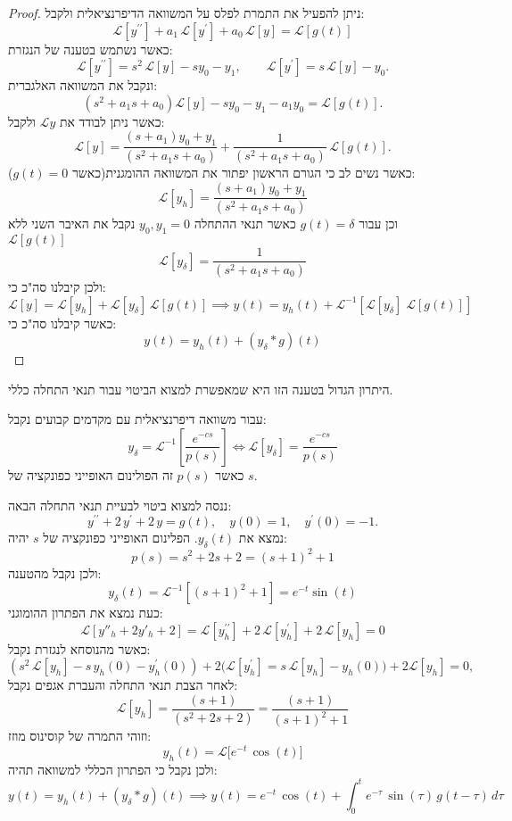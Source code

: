 \documentclass{tstextbook}
\begin{document}
\begin{proof}
ניתן להפעיל את התמרת לפלס על המשוואה הדיפרנציאלית ולקבל:
$${\mathcal{L}}[y^{\prime\prime}]+a_{1}\,{\mathcal{L}}[y^{\prime}]+a_{0}\,{\mathcal{L}}[y]={\mathcal{L}}[g(t)]$$
כאשר נשתמש בטענה של הנגזרת:
$${\mathcal{L}}[y^{\prime\prime}]=s^{2}\,{\mathcal{L}}[y]-s y_{0}-y_{1},\qquad{\mathcal{L}}[y^{\prime}]=s\,{\mathcal{L}}[y]-y_{0}.$$
ונקבל את המשוואה האלגברית:
$$\left(s^{2}+a_{1}s+a_{0}\right){\mathcal{L}}[y]-s y_{0}-y_{1}-a_{1}y_{0}={\mathcal{L}}[g(t)].$$
כאשר ניתן לבודד את \(\mathcal{L}y\) ולקבל:
$${\mathcal{L}}[y]={\frac{(s+a_{1})y_{0}+y_{1}}{(s^{2}+a_{1}s+a_{0})}}+{\frac{1}{(s^{2}+a_{1}s+a_{0})}}\,{\mathcal{L}}[g(t)].$$
כאשר נשים לב כי הגורם הראשון יפתור את המשוואה ההומגנית(כאשר \(g(t)=0\)):
$${\mathcal{L}}[y_{h}]={\frac{(s+a_{1})y_{0}+y_{1}}{(s^{2}+a_{1}s+a_{0})}}$$
וכן עבור \(g(t)=\delta\) כאשר תנאי ההתחלה \(y_{0},y_{1}=0\) נקבל את האיבר השני ללא \(\mathcal{L}[g(t)]\)$${\mathcal{L}}[y_{\delta}]={\frac{1}{(s^{2}+a_{1}s+a_{0})}}$$
ולכן קיבלנו סה"כ כי:
$${\mathcal{L}}[y]={\mathcal{L}}[y_{h}]+{\mathcal{L}}\left[ y_{\delta} \right]\,{\mathcal{L}}[g(t)]\implies y(t)=y_{h}(t)+{\mathcal{L}}^{-1}\left[{\mathcal{L}}[y_{\delta}]\;{\mathcal{L}}[g(t)]\right]$$
כאשר קיבלנו סה"כ כי:
$$y(t)=y_{h}(t)+(y_{\delta}*g)(t)$$

\end{proof}
היתרון הגדול בטענה הזו היא שמאפשרת למצוא הביטוי עבור תנאי התחלה כללי. 

\begin{proposition}
עבור משוואה דיפרנציאלית עם מקדמים קבועים נקבל:
$$y_{\delta}=\mathcal{L}^{-1}\left[ \frac{e^{ -cs }}{p(s)} \right] \iff \mathcal{L}\left[ y_{\delta} \right]=\frac{e^{ -cs }}{p(s)}$$
כאשר \(p(s)\) זה הפולינום האופייני כפונקציה של \(s\).

\end{proposition}
\begin{example}
ננסה למצוא ביטוי לבעיית תנאי התחלה הבאה:
$$y^{\prime\prime}+2\,y^{\prime}+2\,y=g(t),\quad y(0)=1,\quad y^{\prime}(0)=-1.$$
נמצא את \(y_{\delta}(t)\). הפלינום האופייני כפונקציה של \(s\) יהיה:
$$p(s)=s ^{2}+2s+2= (s+1)^{2}+1$$
ולכן נקבל מהטענה:
$$y_{\delta}(t)=\mathcal{L}^{-1}[(s+1)^{2}+1]=e^{ -t }\sin(t)$$
כעת נמצא את הפתרון ההומוגני:
$$\mathcal{L}\left[ y''_{h}+2y'_{h}+2 \right]=\mathcal{L}\left[ y_{h}^{\prime\prime} \right]+2\,\mathcal{L}\left[ y_{h}^{\prime} \right]+2\,\mathcal{L}[y_{h}]=0$$
כאשר מהנוסחא לנגזרת נקבל:
$$\left(s^{2}\,{\mathcal{L}}[y_{h}]-s\,y_{h}(0)-y_{h}^{\prime}(0)\right)+2\big({\mathcal{L}}[y_{h}^{\prime}]=s\,{\mathcal{L}}[y_{h}]-y_{h}(0)\big)+2{\mathcal{L}}[y_{h}]=0,$$
לאחר הצבת תנאי התחלה והעברת אגפים נקבל:
$${\mathcal{L}}[y_{h}]={\frac{(s+1)}{(s^{2}+2s+2)}}={\frac{(s+1)}{(s+1)^{2}+1}}$$
וזוהי התמרה של קוסינוס מוזז:
$$y_{h}(t)={\mathcal{L}}\Big[e^{-t}\,\cos(t)\Big]$$
ולכן נקבל כי הפתרון הכללי למשוואה תהיה:
$$y(t)=y_{h}(t)+\left( y_{\delta}*g \right)(t)\implies y(t)=e^{-t}\,\cos(t)+\int_{0}^{t}e^{-\tau}\,\sin\left( \tau \right)\,g\left( t-\tau \right)\,d\tau$$

\end{example}
\end{document}
